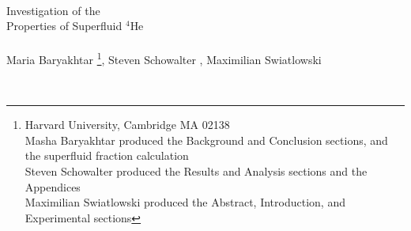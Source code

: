 \documentclass[12pt,notitlepage]{article}
\begin{document}


\begin{titlepage}
\begin{center}
\ \\
\vspace{1in}

{\Huge
Investigation of the \\ Properties of Superfluid $^{4}$He
\\}
\ \\


Maria Baryakhtar \footnote{Harvard University, Cambridge MA 02138 \\ \qquad \qquad Masha Baryakhtar produced the Background and Conclusion sections, and the superfluid fraction calculation \\ \qquad Steven Schowalter produced the Results and Analysis sections and the Appendices \\ \qquad Maximilian Swiatlowski produced the Abstract, Introduction, and Experimental sections}, Steven Schowalter \footnotemark[\value{footnote}], Maximilian Swiatlowski \footnotemark[\value{footnote}] 

\ \\




\end{center}
\end{titlepage}

\clearpage






\end{document}
